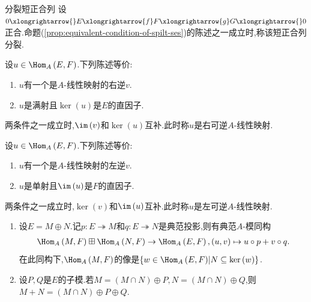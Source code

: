 \begin{definition}{分裂短正合列}{}
	设$0\xlongrightarrow{}E\xlongrightarrow{f}F\xlongrightarrow{g}G\xlongrightarrow{}0$正合.命题(\cref{prop:equivalent-condition-of-spilt-ses})的陈述之一成立时,称该短正合列分裂.
\end{definition}

\begin{corollary}{}{}
	设$u\in\Hom_{A}\left(E,F\right)$.下列陈述等价:
	\begin{enumerate}
		\item $u$有一个是$A$-线性映射的右逆$v$.
		\item $u$是满射且$\ker\left(u\right)$是$E$的直因子.
	\end{enumerate}
	两条件之一成立时,$\im\left(v\right)$和$\ker\left(u\right)$互补.此时称$u$是右可逆$A$-线性映射.
\end{corollary}

\begin{corollary}{}{}
	设$u\in\Hom_{A}\left(E,F\right)$.下列陈述等价:
	\begin{enumerate}
		\item $u$有一个是$A$-线性映射的左逆$v$.
		\item $u$是单射且$\im\left(u\right)$是$F$的直因子.
	\end{enumerate}
	两条件之一成立时,$\ker\left(v\right)$和$\im\left(u\right)$互补.此时称$u$是左可逆$A$-线性映射.
\end{corollary}

\begin{remark}{}{}
	\begin{enumerate}
		\item 设$E=M\oplus N$.记$p:E\twoheadrightarrow M$和$q:E\twoheadrightarrow N$是典范投影,则有典范$A$-模同构
		\begin{align*}
			\Hom_{A}\left(M,F\right)\boxplus\Hom_{A}\left(N,F\right)\to\Hom_{A}\left(E,F\right),\left(u,v\right)\mapsto u\circ p+v\circ q.
		\end{align*}
		在此同构下,$\Hom_{A}\left(M,F\right)$的像是$\left\{w\in\Hom_{A}\left(E,F\right)\middle|N\subseteq\ker\left(w\right)\right\}$.
		\item 设$P,Q$是$E$的子模.若$M=\left(M\cap N\right)\oplus P,N=\left(M\cap N\right)\oplus Q$,则$M+N=\left(M\cap N\right)\oplus P\oplus Q$.
	\end{enumerate}
\end{remark}

